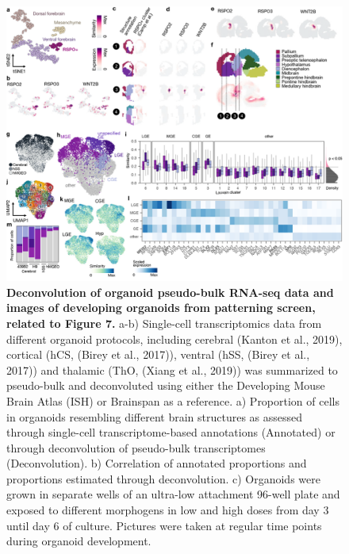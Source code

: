 \begin{figure}[h!]
    \centering
	\includegraphics[width=\textwidth]{figures/voxhunt/Supp_6}
    \caption{\textbf{Deconvolution of organoid pseudo-bulk RNA-seq data and images of developing organoids from patterning screen, related to Figure 7.} a-b) Single-cell transcriptomics data from different organoid protocols, including cerebral (Kanton et al., 2019), cortical (hCS, (Birey et al., 2017)), ventral (hSS, (Birey et al., 2017)) and thalamic (ThO, (Xiang et al., 2019)) was summarized to pseudo-bulk and deconvoluted using either the Developing Mouse Brain Atlas (ISH) or Brainspan as a reference. a) Proportion of cells in organoids resembling different brain structures as assessed through single-cell transcriptome-based annotations (Annotated) or through deconvolution of pseudo-bulk transcriptomes (Deconvolution). b) Correlation of annotated proportions and proportions estimated through deconvolution. c) Organoids were grown in separate wells of an ultra-low attachment 96-well plate and exposed to different morphogens in low and high doses from day 3 until day 6 of culture. Pictures were taken at regular time points during organoid development.}
    \label{fig:voxS7}
\end{figure}

